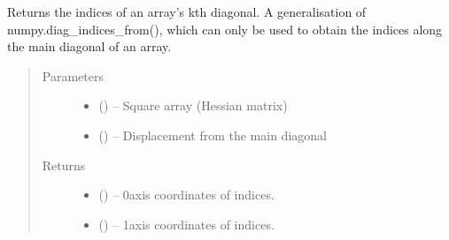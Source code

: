 \documentclass[letterpaper,10pt,english]{sphinxmanual}
\begin{document}
\begin{fulllineitems}
\label{\detokenize{references/nlp/_funcs:nmrespy.nlp._funcs._diagonal_indices}}
\sphinxAtStartPar
Returns the indices of an array’s kth diagonal. A generalisation of
numpy.diag\_indices\_from(), which can only be used to obtain the indices
along the main diagonal of an array.
\begin{quote}\begin{description}
\item[{Parameters}] \leavevmode\begin{itemize}
\item {} 
\sphinxAtStartPar
{} () – Square array (Hessian matrix)

\item {} 
\sphinxAtStartPar
{} () – Displacement from the main diagonal

\end{itemize}

\item[{Returns}] \leavevmode
\sphinxAtStartPar
\begin{itemize}
\item {} 
\sphinxAtStartPar
{} () – 0\sphinxhyphen{}axis coordinates of indices.

\item {} 
\sphinxAtStartPar
{} () – 1\sphinxhyphen{}axis coordinates of indices.

\end{itemize}


\end{description}\end{quote}

\end{fulllineitems}

\end{document}
